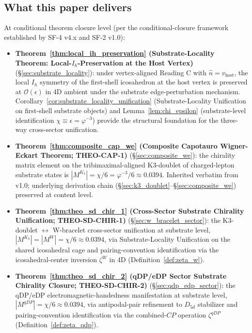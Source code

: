 \documentclass[11pt,letterpaper]{article}
\newcommand{\phig}{\varphi}
\newcommand{\Kthree}{\ensuremath{K_3}}
\begin{document}
\subsection{What this paper delivers}\label{sec:what_delivers}

At conditional theorem closure level (per the conditional-closure framework~\cite{abshier_conditional_closure} established by SF-4 v4.x and SF-2 v1.0):

\begin{itemize}\setlength\itemsep{0.2em}
    \item \textbf{Theorem~\ref{thm:local_ih_preservation} (Substrate-Locality Theorem: Local-$I_h$-Preservation at the Host Vertex)} (\S\ref{sec:substrate_locality}): under vertex-aligned Reading C with $\hat{n} = v_{\text{host}}$, the local $I_h$ symmetry of the first-shell icosahedron at the host vertex is preserved at $\mathcal{O}(\epsilon)$ in 4D ambient under the substrate edge-perturbation mechanism. Corollary~\ref{cor:substrate_locality_unification} (Substrate-Locality Unification on first-shell substrate objects) and Lemma~\ref{lem:chi_epsilon} (substrate-level identification $\chi \equiv \epsilon = \phig^{-3}$) provide the structural foundation for the three-way cross-sector unification.
    \item \textbf{Theorem~\ref{thm:composite_cap_we} (Composite Capotauro Wigner-Eckart Theorem; THEO-CAP-1)} (\S\ref{sec:composite_we}): the chirality matrix element on the tribimaximal-aligned K3-doublet of charged-lepton substrate states is $|M^{\Kthree}| = \chi/6 = \phig^{-3}/6 \approx 0.0394$. Inherited verbatim from v1.0; underlying derivation chain (\S\ref{sec:k3_doublet}--\S\ref{sec:composite_we}) preserved at content level.
    \item \textbf{Theorem~\ref{thm:theo_sd_chir_1} (Cross-Sector Substrate Chirality Unification; THEO-SD-CHIR-1)} (\S\ref{sec:w_bracelet_sector}): the K3-doublet $\leftrightarrow$ W-bracelet cross-sector unification at substrate level, $|M^{\Kthree}| = |M^W| = \chi/6 \approx 0.0394$, via Substrate-Locality Unification on the shared icosahedral cage and pairing-convention identification via the icosahedral-center inversion $\zeta^W$ in 4D (Definition~\ref{def:zeta_w}).
    \item \textbf{Theorem~\ref{thm:theo_sd_chir_2} (qDP/eDP Sector Substrate Chirality Closure; THEO-SD-CHIR-2)} (\S\ref{sec:qdp_edp_sector}): the qDP/eDP electromagnetic-handedness manifestation at substrate level, $|M^{qDP}| = \chi/6 \approx 0.0394$, via antipodal-pair refinement to $D_{5d}$ stabilizer and pairing-convention identification via the combined-$CP$ operation $\zeta^{qDP}$ (Definition~\ref{def:zeta_qdp}).

\end{itemize}
\end{document}
